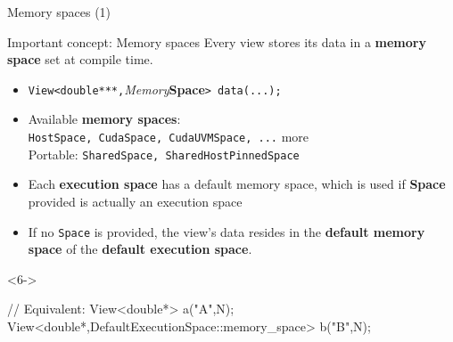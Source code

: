 \begin{frame}[fragile]{Memory spaces (1)}

  \begin{block}{Important concept: Memory spaces}
    Every view stores its data in a \textbf{memory space} set at compile time.
  \end{block}

  \vspace{10pt}

  \begin{itemize}
  \item<2->{\texttt{View<double***,}{\textit{Memory}\textbf{Space}}\texttt{> data(...);}}
  \item<3->{Available \textbf{memory spaces}: \\
            \hspace{20pt}\texttt{HostSpace, CudaSpace, CudaUVMSpace, ...} more} \\
            \hspace{20pt}Portable: \texttt{SharedSpace, SharedHostPinnedSpace}
  \item<4->{Each \textbf{execution space} has a default memory space, which is used if \textbf{Space} provided is actually an execution space}
  \item<5->{If no \texttt{Space} is provided, the view's data resides in the \textbf{default memory space} of the \textbf{default execution space}.}
  \end{itemize}

  \begin{uncoverenv}<6->
  \begin{code}[keywords={View,DefaultExecutionSpace,memory_space}]
  // Equivalent:
  View<double*> a("A",N);
  View<double*,DefaultExecutionSpace::memory_space> b("B",N);
  \end{code}
  \end{uncoverenv}
\end{frame}


